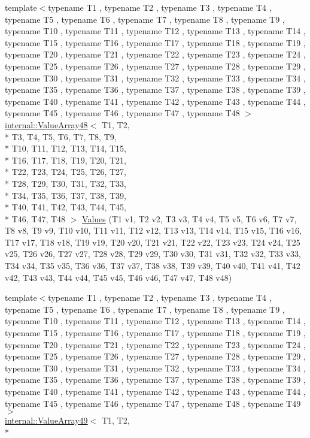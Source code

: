 \begin{DoxyCompactItemize}
\item 
{\footnotesize template$<$typename T1 , typename T2 , typename T3 , typename T4 , typename T5 , typename T6 , typename T7 , typename T8 , typename T9 , typename T10 , typename T11 , typename T12 , typename T13 , typename T14 , typename T15 , typename T16 , typename T17 , typename T18 , typename T19 , typename T20 , typename T21 , typename T22 , typename T23 , typename T24 , typename T25 , typename T26 , typename T27 , typename T28 , typename T29 , typename T30 , typename T31 , typename T32 , typename T33 , typename T34 , typename T35 , typename T36 , typename T37 , typename T38 , typename T39 , typename T40 , typename T41 , typename T42 , typename T43 , typename T44 , typename T45 , typename T46 , typename T47 , typename T48 $>$ }\\\hyperlink{classtesting_1_1internal_1_1_value_array48}{internal\-::\-Value\-Array48}$<$ T1, T2, \\*
T3, T4, T5, T6, T7, T8, T9, \\*
T10, T11, T12, T13, T14, T15, \\*
T16, T17, T18, T19, T20, T21, \\*
T22, T23, T24, T25, T26, T27, \\*
T28, T29, T30, T31, T32, T33, \\*
T34, T35, T36, T37, T38, T39, \\*
T40, T41, T42, T43, T44, T45, \\*
T46, T47, T48 $>$ \hyperlink{namespacetesting_af3cdf373b137d357bb3a814c097bcd06}{Values} (T1 v1, T2 v2, T3 v3, T4 v4, T5 v5, T6 v6, T7 v7, T8 v8, T9 v9, T10 v10, T11 v11, T12 v12, T13 v13, T14 v14, T15 v15, T16 v16, T17 v17, T18 v18, T19 v19, T20 v20, T21 v21, T22 v22, T23 v23, T24 v24, T25 v25, T26 v26, T27 v27, T28 v28, T29 v29, T30 v30, T31 v31, T32 v32, T33 v33, T34 v34, T35 v35, T36 v36, T37 v37, T38 v38, T39 v39, T40 v40, T41 v41, T42 v42, T43 v43, T44 v44, T45 v45, T46 v46, T47 v47, T48 v48)
\item 
{\footnotesize template$<$typename T1 , typename T2 , typename T3 , typename T4 , typename T5 , typename T6 , typename T7 , typename T8 , typename T9 , typename T10 , typename T11 , typename T12 , typename T13 , typename T14 , typename T15 , typename T16 , typename T17 , typename T18 , typename T19 , typename T20 , typename T21 , typename T22 , typename T23 , typename T24 , typename T25 , typename T26 , typename T27 , typename T28 , typename T29 , typename T30 , typename T31 , typename T32 , typename T33 , typename T34 , typename T35 , typename T36 , typename T37 , typename T38 , typename T39 , typename T40 , typename T41 , typename T42 , typename T43 , typename T44 , typename T45 , typename T46 , typename T47 , typename T48 , typename T49 $>$ }\\\hyperlink{classtesting_1_1internal_1_1_value_array49}{internal\-::\-Value\-Array49}$<$ T1, T2, \\*

\end{DoxyCompactItemize}
